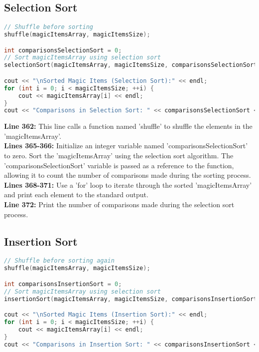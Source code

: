 \documentclass[letterpaper, 10pt,DIV=13]{scrartcl}
\numberwithin{equation}{section} %
\numberwithin{figure}{section} %
\numberwithin{table}{section} %
\begin{document}
\subsection{Selection Sort}
\begin{linenumbers}
\begin{lstlisting}[language=C++, caption={Selection Sort}, label={code:example}]
// Shuffle before sorting
shuffle(magicItemsArray, magicItemsSize);

int comparisonsSelectionSort = 0;
// Sort magicItemsArray using selection sort
selectionSort(magicItemsArray, magicItemsSize, comparisonsSelectionSort);

cout << "\nSorted Magic Items (Selection Sort):" << endl;
for (int i = 0; i < magicItemsSize; ++i) {
    cout << magicItemsArray[i] << endl;
}
cout << "Comparisons in Selection Sort: " << comparisonsSelectionSort << endl;
\end{lstlisting}
\end{linenumbers}
\nolinenumbers

\textbf{Line 362:} This line calls a function named 'shuffle' to shuffle the elements in the 'magicItemsArray'. \\
\textbf{Lines 365-366:} Initialize an integer variable named 'comparisonsSelectionSort' to zero. Sort the 'magicItemsArray' using the selection sort algorithm. The 'comparisonsSelectionSort' variable is passed as a reference to the function, allowing it to count the number of comparisons made during the sorting process. \\
\textbf{Lines 368-371:} Use a 'for' loop to iterate through the sorted 'magicItemsArray' and print each element to the standard output. \\
\textbf{Line 372:} Print the number of comparisons made during the selection sort process.

\subsection{Insertion Sort}
\begin{linenumbers}
\begin{lstlisting}[language=C++, caption={Insertion Sort}, label={code:example}]
// Shuffle before sorting again
shuffle(magicItemsArray, magicItemsSize);

int comparisonsInsertionSort = 0;
// Sort magicItemsArray using selection sort
insertionSort(magicItemsArray, magicItemsSize, comparisonsInsertionSort);

cout << "\nSorted Magic Items (Insertion Sort):" << endl;
for (int i = 0; i < magicItemsSize; ++i) {
    cout << magicItemsArray[i] << endl;
}
cout << "Comparisons in Insertion Sort: " << comparisonsInsertionSort << endl;
\end{lstlisting}
\end{linenumbers}
\nolinenumbers
\end{document}
